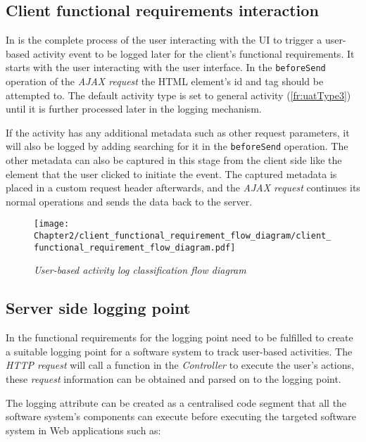 \subsection{Client functional requirements interaction}
\par In  is the complete process of the user interacting with the UI to trigger a user-based activity event to be logged later for the client's functional requirements. It starts with the user interacting with the user interface. In the \texttt{beforeSend} operation of the \textit{AJAX request} the HTML element's id and tag should be attempted to. The default activity type is set to general activity (\ref{fr:uatType3}) until it is further processed later in the logging mechanism.\par If the activity has any additional metadata such as other request parameters, it will also be logged by adding searching for it in the \texttt{beforeSend} operation. The other metadata can also be captured in this stage from the client side like the element that the user clicked to initiate the event. The captured metadata is placed in a custom request header afterwards, and the \textit{AJAX request} continues its normal operations and sends the data back to the server.

\begin{figure}[!htb] %
	\centering %
	\texttt{[image: Chapter2/client\_functional\_requirement\_flow\_diagram/client\_functional\_requirement\_flow\_diagram.pdf]}
	\caption[User-based activity log classification flow diagram]
	{\textit{User-based activity log classification flow diagram}}\label{fig:ch2_user_based_actvity_classification}
\end{figure}

\clearpage

\subsection{Server side logging point}\label{sec:ch2_serverSideLoggingpoint}
In  the functional requirements for the logging point need to be fulfilled to create a suitable logging point for a software system to track user-based activities. The \textit{HTTP request} will call a function in the \textit{Controller} to execute the user's actions, these \textit{request} information can be obtained and parsed on to the logging point.\par The logging attribute can be created as a centralised code segment that all the software system's components can execute before executing the targeted software system in Web applications such as:

